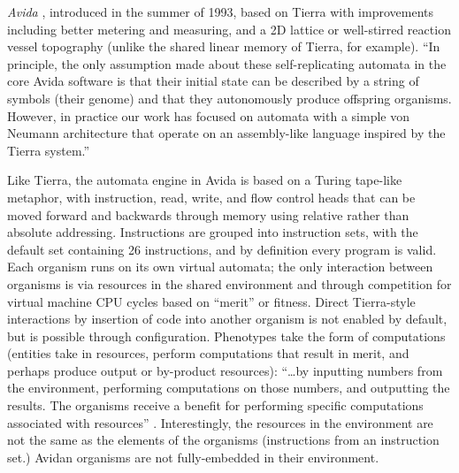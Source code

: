 \emph{Avida} \parencite{Ofria2004}, introduced in the summer of 1993, based on Tierra with improvements including better metering and measuring, and a 2D lattice or well-stirred reaction vessel topography (unlike the shared linear memory of Tierra, for example). ``In principle, the only assumption made about these self-replicating automata in the core Avida software is that their initial state can be described by a string of symbols (their genome) and that they autonomously produce offspring organisms. However, in practice our work has focused on automata with a simple von Neumann architecture that operate on an assembly-like language inspired by the Tierra system.''

Like Tierra, the automata engine in Avida is based on a Turing tape-like metaphor, with instruction, read, write, and flow control heads that can be moved forward and backwards through memory using relative rather than absolute addressing. Instructions are grouped into instruction sets, with the default set containing 26 instructions, and by definition every program is valid. Each organism runs on its own virtual automata; the only interaction between organisms is via resources in the shared environment and through competition for virtual machine CPU cycles based on ``merit'' or fitness. Direct Tierra-style interactions by insertion of code into another organism is not enabled by default, but is possible through configuration. Phenotypes take the form of computations (entities take in resources, perform computations that result in merit, and perhaps produce output or by-product resources): ``\ldots by inputting numbers from the environment, performing computations on those numbers, and outputting the results. The organisms receive a benefit for performing specific computations associated with resources'' \parencite{Ofria2004}. Interestingly, the resources in the environment are not the same as the elements of the organisms (instructions from an instruction set.) Avidan organisms are not fully-embedded in their environment.

